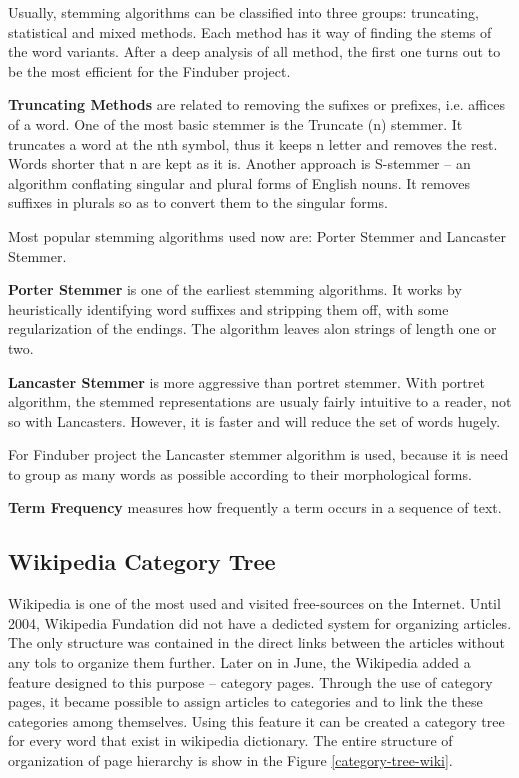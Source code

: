 Usually, stemming algorithms can be classified into three groups: truncating, statistical and mixed methods. Each method has it way of finding the stems of the word variants. After a deep analysis of all method, the first one turns out to be the most efficient for the Finduber project. 

\textbf{Truncating Methods} are related to removing the sufixes or prefixes, i.e. affices of a word. One of the most basic stemmer is the Truncate (n) stemmer. It truncates a word at the nth symbol, thus it keeps n letter and removes the rest. Words shorter that n are kept as it is. Another approach is S-stemmer -- an algorithm conflating singular and plural forms of English nouns. It removes suffixes in plurals so as to convert them to the singular forms. \cite{truncat-stemm}

Most popular stemming algorithms used now are: Porter Stemmer and Lancaster Stemmer.

\textbf{Porter Stemmer} is one of the earliest stemming algorithms. It works by heuristically identifying word suffixes and stripping them off, with some regularization of the endings. The algorithm leaves alon strings of length one or two. 

\textbf{Lancaster Stemmer} is more aggressive than portret stemmer. With portret algorithm, the stemmed representations are usualy fairly intuitive to a reader, not so with Lancasters. However, it is faster and will reduce the set of words hugely. 

For Finduber project the Lancaster stemmer algorithm is used, because it is need to group as many words as possible according to their morphological forms.

\textbf{Term Frequency} measures how frequently a term occurs in a sequence of text.

\subsection{Wikipedia Category Tree}

Wikipedia is one of the most used and visited free-sources on the Internet. Until 2004, Wikipedia Fundation did not have a dedicted system for organizing articles. The only structure was contained in the direct links between the articles without any tols to organize them further.\cite{wikicategory} Later on in June, the Wikipedia added a feature designed to this purpose -- category pages. Through the use of category pages, it became possible to assign articles to categories and to link the these categories among themselves. Using this feature it can be created a category tree for every word that exist in wikipedia dictionary. The entire structure of organization of page hierarchy is show in the Figure \ref{category-tree-wiki}. 

